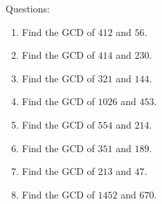 \documentclass[16pt]{article}
\theoremstyle{remark}
\begin{document}
\newpage
Questions:
\begin{enumerate}
\item Find the GCD of $412$ and $56$.
\vspace{5cm}
\item Find the GCD of $414$ and $230$.
\vspace{5cm}
\item Find the GCD of $321$ and $144$.
\vspace{5cm}
\item Find the GCD of $1026$ and $453$.
\vspace{5cm}
\item Find the GCD of $554$ and $214$.
\vspace{5cm}
\item Find the GCD of $351$ and $189$.
\vspace{5cm}
\item Find the GCD of $213$ and $47$.
\vspace{5cm}
\item Find the GCD of $1452$ and $670$.
\vspace{5cm}
\end{enumerate}
\end{document}
